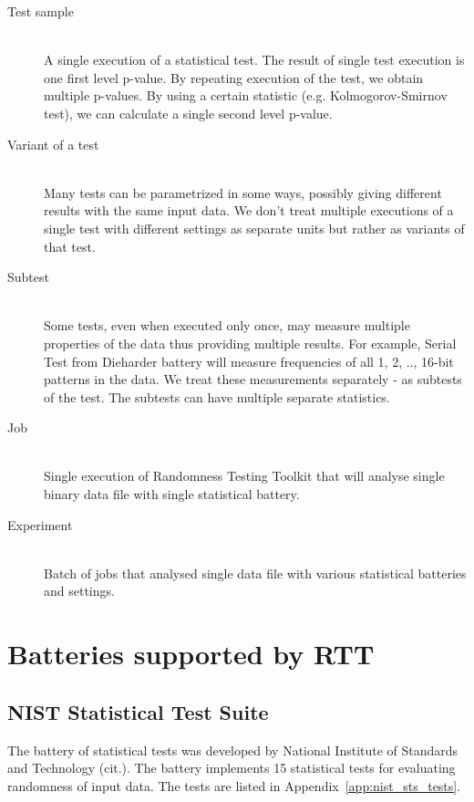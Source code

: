 \documentclass[
  digital,  	%
  color,		%
  oneside,   	%
  12pt,
  nocover,
  notable,
  nolof,
  nolot,
]{fithesis3}
\begin{document}
\begin{description}
\item[Test sample] \hfill \\
A single execution of a statistical test. The result of single test execution is one first level p-value. By repeating execution of the test, we obtain multiple p-values. By using a certain statistic (e.g. Kolmogorov-Smirnov test), we can calculate a single second level p-value.

\item[Variant of a test] \hfill \\
Many tests can be parametrized in some ways, possibly giving different results with the same input data. We don't treat multiple executions of a single test with different settings as separate units but rather as variants of that test.

\item[Subtest] \hfill \\
Some tests, even when executed only once, may measure multiple properties of the data thus providing multiple results. For example, Serial Test from Dieharder battery will measure frequencies of all 1, 2, .., 16-bit patterns in the data. We treat these measurements separately - as subtests of the test. The subtests can have multiple separate statistics.

\item[Job] \hfill \\
Single execution of Randomness Testing Toolkit that will analyse single binary data file with single statistical battery.

\item[Experiment] \hfill \\
Batch of jobs that analysed single data file with various statistical batteries and settings.

\end{description}

\section{Batteries supported by RTT}
\subsection{NIST Statistical Test Suite}
The battery of statistical tests was developed by National Institute of Standards and Technology (cit.). The battery implements 15 statistical tests for evaluating randomness of input data. The tests are listed in Appendix~\ref{app:nist_sts_tests}.
\end{document}
